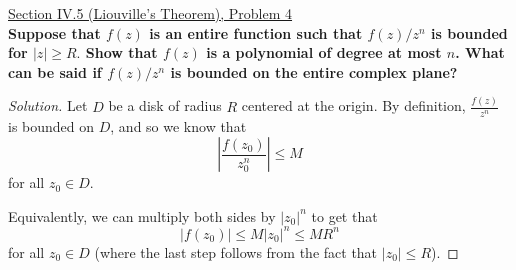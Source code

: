 \documentclass[11pt]{article}
\newenvironment{solution}
  {\renewcommand\qedsymbol{$\blacksquare$}\begin{proof}[Solution]}
  {\end{proof}}
\theoremstyle{definition}
\begin{document}
\newpage

\underline{Section IV.5 (Liouville's Theorem), Problem 4} \\

\textbf{Suppose that $f(z)$ is an entire function such that $f(z)/z^n$ is bounded for $|z| \geq R.$ Show that $f(z)$ is a polynomial of degree at most $n$. What can be said
if $f(z)/z^n$ is bounded on the entire complex plane?}

\begin{solution}
Let $D$ be a disk of radius $R$ centered at the origin. By definition, $\frac{f(z)}{z^n}$ is bounded on $D$, and so we know that \[ \left|\frac{f(z_0)}{z_0^n}\right|  \leq M\] for all $z_0 \in D$. 

Equivalently, we can multiply both sides by $|z_0|^n$ to get that \[ |f(z_0)| \leq M |z_0|^n \leq MR^n \] for all $z_0 \in D$ (where the last step follows from the fact that $|z_0| \leq R$).
\end{solution}
\end{document}
